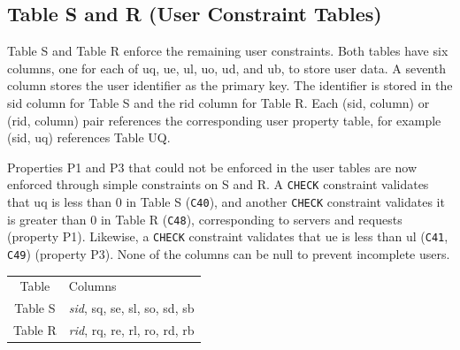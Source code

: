 \subsection{Table S and R (User Constraint Tables)}
Table S and Table R enforce the remaining user constraints.  Both tables have
six columns, one for each of \textsf{uq}, \textsf{ue}, \textsf{ul},
\textsf{uo}, \textsf{ud}, and \textsf{ub}, to store user data. A seventh column
stores the user identifier as the primary key. The identifier is stored in the
\textsf{sid} column for Table S and the \textsf{rid} column for Table R.  Each
(\textsf{sid}, column) or (\textsf{rid}, column) pair references the
corresponding user property table, for example (\textsf{sid}, \textsf{uq})
references Table UQ.

Properties P1 and P3 that could not be enforced in the user tables are now
enforced through simple constraints on S and R.  A \texttt{CHECK} constraint
validates that \textsf{uq} is less than 0 in Table S ({\tt{}C40}), and another
\texttt{CHECK} constraint validates it is greater than 0 in Table R ({\tt{}C48}),
corresponding to servers and requests (property P1). Likewise, a \texttt{CHECK}
constraint validates that \textsf{ue} is less than \textsf{ul} ({\tt{}C41},
{\tt{}C49}) (property P3). None of the columns can be null to prevent incomplete
users.
\begin{table}[h]
\centering
\small
\begin{tabular}{|c|l|}
\hline
\rowcolor{TableTitle}
\multicolumn{2}{|c|}{User Constraint Tables}\\
\hline
\rowcolor{TableHeader}
Table & Columns \\
\hline
Table S & \textit{sid}, sq, se, sl, so, sd, sb \\
Table R & \textit{rid}, rq, re, rl, ro, rd, rb \\
\hline
\end{tabular}
\end{table}

